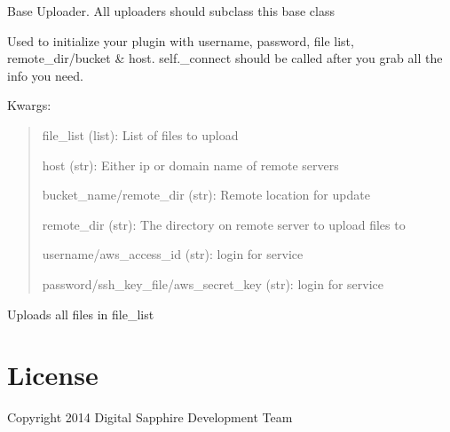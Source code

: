 \documentclass[letterpaper,10pt,english]{sphinxmanual}
\begin{document}
\label{api:module-pyi_updater.uploader.common}

\begin{fulllineitems}
\label{api:pyi_updater.uploader.common.BaseUploader}
Base Uploader.  All uploaders should subclass
this base class

\begin{fulllineitems}
\label{api:pyi_updater.uploader.common.BaseUploader.init}
Used to initialize your plugin with username,
password, file list, remote\_dir/bucket \& host.
self.\_connect should be called after you grab all the
info you need.

Kwargs:
\begin{quote}

file\_list (list): List of files to upload

host (str): Either ip or domain name of remote servers

bucket\_name/remote\_dir (str): Remote location for update

remote\_dir (str): The directory on remote server to upload files to

username/aws\_access\_id (str): login for service

password/ssh\_key\_file/aws\_secret\_key (str): login for service
\end{quote}

\end{fulllineitems}


\begin{fulllineitems}
\label{api:pyi_updater.uploader.common.BaseUploader.upload}
Uploads all files in file\_list

\end{fulllineitems}


\end{fulllineitems}



\section{License}
\label{license::doc}\label{license:license}\label{license:id1}
Copyright 2014 Digital Sapphire Development Team
\end{document}
